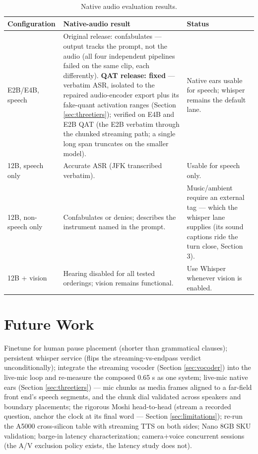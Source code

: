 \documentclass{article}
\begin{document}
\begin{table}[H]
	\centering
	\small
	\begin{tabularx}{\textwidth}{lXX}
		\toprule
		Configuration & Native-audio result & Status \\
		\midrule
		E2B/E4B, speech &
		Original release: confabulates --- output tracks the prompt, not the audio (all four independent pipelines failed on the same clip, each differently). \textbf{QAT release: fixed} --- verbatim ASR, isolated to the repaired audio-encoder export plus its fake-quant activation ranges (Section \ref{sec:threetiers}); verified on E4B and E2B QAT (the E2B verbatim through the chunked streaming path; a single long span truncates on the smaller model). &
		Native ears usable for speech; whisper remains the default lane. \\

		12B, speech only &
		Accurate ASR (JFK transcribed verbatim). &
		Usable for speech only. \\

		12B, non-speech only &
		Confabulates or denies; describes the instrument named in the prompt. &
		Music/ambient require an external tag --- which the whisper lane supplies (its sound captions ride the turn close, Section 3). \\

		12B + vision &
		Hearing disabled for all tested orderings; vision remains functional. &
		Use Whisper whenever vision is enabled. \\
		\bottomrule
	\end{tabularx}
	\caption{Native audio evaluation results.}
	\label{tab:native-audio}
\end{table}

\section{Future Work}
\label{sec:future}

Finetune for human pause placement (shorter than grammatical clauses); persistent whisper service (flips the streaming-vs-endpass verdict unconditionally); integrate the streaming vocoder (Section \ref{sec:vocoder}) into the live-mic loop and re-measure the composed 0.65 s as one system; live-mic native ears (Section \ref{sec:threetiers}) --- mic chunks as media frames aligned to a far-field front end's speech segments, and the chunk dial validated across speakers and boundary placements; the rigorous Moshi head-to-head (stream a recorded question, anchor the clock at its final word --- Section \ref{sec:limitations}); re-run the A5000 cross-silicon table with streaming TTS on both sides; Nano 8GB SKU validation; barge-in latency characterization; camera+voice concurrent sessions (the A/V exclusion policy exists, the latency study does not).
\end{document}
